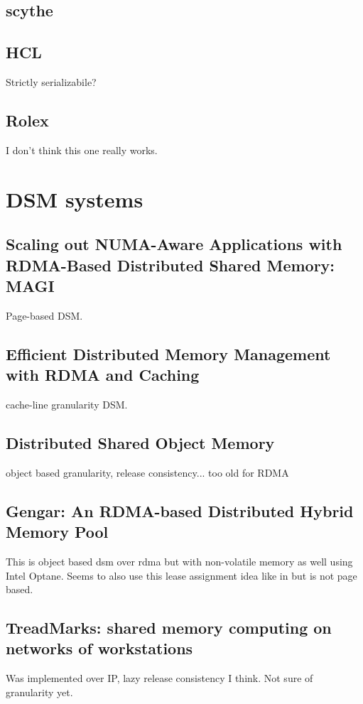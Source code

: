 \documentclass[sigplan,nonacm]{acmart}
\begin{document}
    \subsection{scythe }


    \subsection{HCL }
    Strictly serializabile?

    \subsection{Rolex}
    I don't think this one really works.
\section {DSM systems}

    \subsection{Scaling out NUMA-Aware Applications with RDMA-Based Distributed Shared Memory: MAGI}
    Page-based DSM. \cite{Hong-JCST-2019}

    \subsection{Efficient Distributed Memory Management with RDMA and Caching }
    cache-line granularity DSM.\cite{Cai-VLDB-2018}

    \subsection{Distributed Shared Object Memory}
    object based granularity, release consistency... too old for RDMA\cite{Guedes-WWOSIII-1993}

    \subsection{Gengar: An RDMA-based Distributed Hybrid Memory Pool}
    This is object based dsm over rdma but with non-volatile memory as well using Intel Optane. Seems to 
    also use this lease assignment idea like in \cite{Endo-IPDRM-2020} but is not page based.\cite{Duan-ICDCS-2021}

    \subsection{TreadMarks: shared memory computing on networks of workstations}
    Was implemented over IP, lazy release consistency I think. Not sure of granularity yet.\cite{Amza-Usenix-1994}
\end{document}
